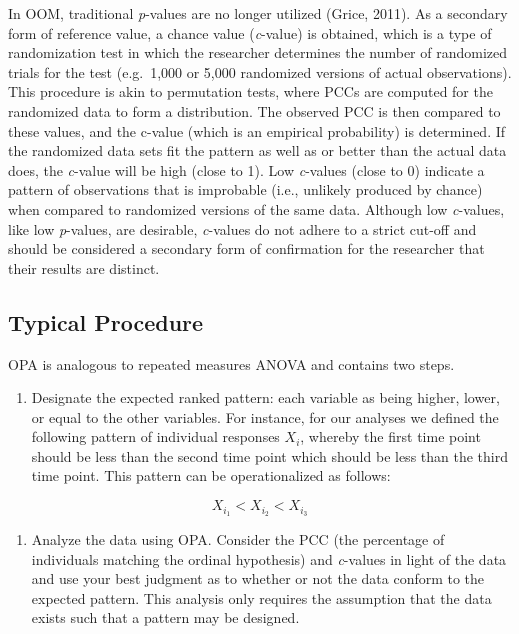 \documentclass[english,mask,man]{apa6}
\providecommand{\tightlist}{%
  \setlength{\itemsep}{0pt}\setlength{\parskip}{0pt}}
\theoremstyle{definition}
\theoremstyle{definition}
\theoremstyle{definition}
\theoremstyle{remark}
\begin{document}
In OOM, traditional \emph{p}-values are no longer utilized (Grice,
2011). As a secondary form of reference value, a chance value
(\emph{c}-value) is obtained, which is a type of randomization test in
which the researcher determines the number of randomized trials for the
test (e.g.~1,000 or 5,000 randomized versions of actual observations).
This procedure is akin to permutation tests, where PCCs are computed for
the randomized data to form a distribution. The observed PCC is then
compared to these values, and the c-value (which is an empirical
probability) is determined. If the randomized data sets fit the pattern
as well as or better than the actual data does, the \emph{c}-value will
be high (close to 1). Low \emph{c}-values (close to 0) indicate a
pattern of observations that is improbable (i.e., unlikely produced by
chance) when compared to randomized versions of the same data. Although
low \emph{c}-values, like low \emph{p}-values, are desirable,
\emph{c}-values do not adhere to a strict cut-off and should be
considered a secondary form of confirmation for the researcher that
their results are distinct.

\subsection{Typical Procedure}\label{typical-procedure-1}

OPA is analogous to repeated measures ANOVA and contains two steps.

\begin{enumerate}
\def\labelenumi{\arabic{enumi})}
\tightlist
\item
  Designate the expected ranked pattern: each variable as being higher,
  lower, or equal to the other variables. For instance, for our analyses
  we defined the following pattern of individual responses \(X_i\),
  whereby the first time point should be less than the second time point
  which should be less than the third time point. This pattern can be
  operationalized as follows:
\end{enumerate}

\[
  X_{i_1} < X_{i_2} < X_{i_3}   
\]

\begin{enumerate}
\def\labelenumi{\arabic{enumi})}
\setcounter{enumi}{1}
\tightlist
\item
  Analyze the data using OPA. Consider the PCC (the percentage of
  individuals matching the ordinal hypothesis) and \emph{c}-values in
  light of the data and use your best judgment as to whether or not the
  data conform to the expected pattern. This analysis only requires the
  assumption that the data exists such that a pattern may be designed.
\end{enumerate}
\end{document}
